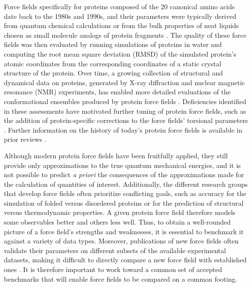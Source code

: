 \documentclass[9pt,review,pubversion]{livecoms}
\begin{document}
Force fields specifically for proteins composed of the 20 canonical amino acids date back to the 1980s and 1990s, and their parameters were typically derived from quantum chemical calculations or from the bulk properties of neat liquids chosen as small molecule analogs of protein fragments \cite{jorgensen_opls_1988,cornell_second_1995,mackerell_all-atom_1998}.
The quality of these force fields was then evaluated by running simulations of proteins in water and computing the root mean square deviation (RMSD) of the simulated protein’s atomic coordinates from the corresponding coordinates of a static crystal structure of the protein.
Over time, a growing collection of structural and dynamical data on proteins, generated by X-ray diffraction and nuclear magnetic resonance (NMR) experiments, has enabled more detailed evaluations of the conformational ensembles produced by protein force fields \cite{smith_comparison_1995,van_der_spoel_molecular_1996,van_der_spoel_solution_1998,stocker_molecular_2000,van_der_spoel_brute-force_2003,oostenbrink_validation_2005}.
Deficiencies identified in these assessments have motivated further tuning of protein force fields, such as the addition of protein-specific corrections to the force fields’ torsional parameters \cite{lindorff-larsen_improved_2010,best_optimization_2012,mackerell_jr_extending_2004,Hornak:2006:Proteins,Maier:2015:J.Chem.TheoryComput.,diem_hamiltonian_2020,tian_ff19sb_2020}.
Further information on the history of today’s protein force fields is available in prior reviews \cite{lifson_recent_1973,ponder_force_2003,guvench_comparison_2008,zhu_recent_2012,dauber-osguthorpe_biomolecular_2019}.

Although modern protein force fields have been fruitfully applied, they still provide only approximations to the true quantum mechanical energies, and it is not possible to predict {\em a priori} the consequences of the approximations made for the calculation of quantities of interest. 
Additionally, the different research groups that develop force fields often prioritize conflicting goals, such as accuracy for the simulation of folded versus disordered proteins or for the prediction of structural versus thermodynamic properties.
A given protein force field therefore models some observables better and others less well.
Thus, to obtain a well-rounded picture of a force field’s strengths and weaknesses, it is essential to benchmark it against a variety of data types.
Moreover, publications of new force fields often validate their parameters on different subsets of the available experimental datasets, making it difficult to directly compare a new force field with established ones \cite{hagler_force_2019}.
It is therefore important to work toward a common set of accepted benchmarks that will enable force fields to be compared on a common footing.
\end{document}
